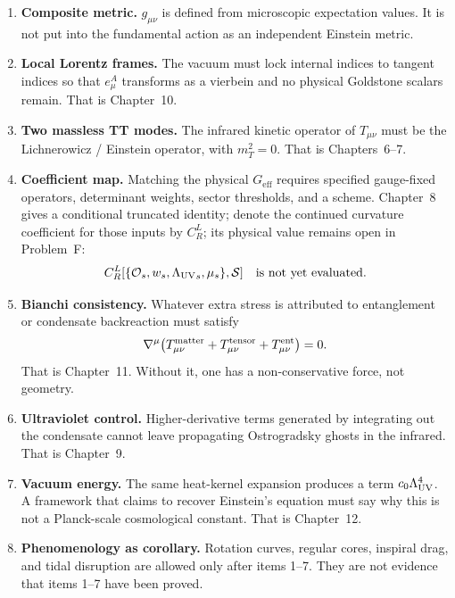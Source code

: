 \begin{enumerate}
  \item \textbf{Composite metric.}
    \(g_{\mu\nu}\) is defined from microscopic expectation values. It
    is not put into the fundamental action as an independent Einstein
    metric.
  \item \textbf{Local Lorentz frames.}
    The vacuum must lock internal indices to tangent indices so that
    \(e^A_\mu\) transforms as a vierbein and no physical Goldstone
    scalars remain. That is Chapter~10.
  \item \textbf{Two massless TT modes.}
    The infrared kinetic operator of \(T_{\mu\nu}\) must be the
    Lichnerowicz / Einstein operator, with \(m_T^2=0\). That is
    Chapters~6--7.
  \item \textbf{Coefficient map.}
    Matching the physical \(G_{\mathrm{eff}}\) requires specified
    gauge-fixed operators, determinant weights, sector thresholds,
    and a scheme. Chapter~8 gives a conditional truncated identity;
    denote the continued curvature coefficient for those inputs by
    \(C_R^L\); its physical value remains open in Problem~F:
    \begin{equation}
      \label{eq:geff-preview}
      C_R^L[\{\mathcal O_s,w_s,{\Lambda_{\mathrm{UV}}}_s,\mu_s\},\mathcal S]
      \quad\text{is not yet evaluated.}
    \end{equation}
  \item \textbf{Bianchi consistency.}
    Whatever extra stress is attributed to entanglement or condensate
    backreaction must satisfy
    \begin{equation}
      \label{eq:conservation-preview}
      \nabla^\mu\bigl(
        T^{\mathrm{matter}}_{\mu\nu}
        +T^{\mathrm{tensor}}_{\mu\nu}
        +T^{\mathrm{ent}}_{\mu\nu}
      \bigr)=0.
    \end{equation}
    That is Chapter~11. Without it, one has a non-conservative force,
    not geometry.
  \item \textbf{Ultraviolet control.}
    Higher-derivative terms generated by integrating out the condensate
    cannot leave propagating Ostrogradsky ghosts in the infrared. That
    is Chapter~9.
  \item \textbf{Vacuum energy.}
    The same heat-kernel expansion produces a term
    \(c_0\Lambda_{\mathrm{UV}}^4\). A framework that claims to recover Einstein's
    equation must say why this is not a Planck-scale cosmological
    constant. That is Chapter~12.
  \item \textbf{Phenomenology as corollary.}
    Rotation curves, regular cores, inspiral drag, and tidal disruption
    are allowed only after items 1--7. They are not evidence that
    items 1--7 have been proved.
\end{enumerate}


